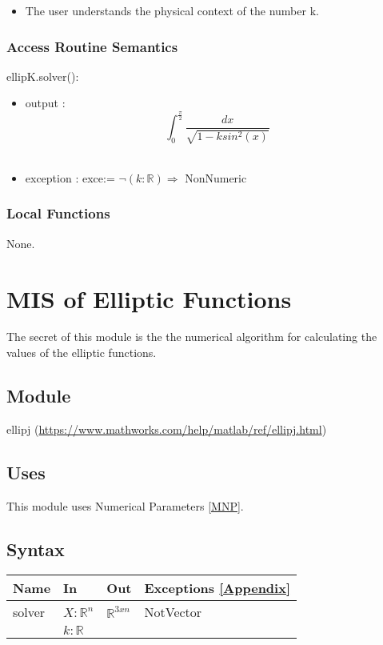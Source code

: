 \documentclass[12pt, titlepage]{article}
\begin{document}
\begin{itemize}
	\item The user understands the physical context of the number k.  
\end{itemize}

\subsubsection{Access Routine Semantics}

\noindent ellipK.solver():
\begin{itemize}
	\item output : \\
	$$ 
	\int_{0}^{\frac{\pi}{2}} \frac{dx}{\sqrt{1-ksin^{2}(x)}}$$ \\
	\item exception : exce:= $\neg(k : \mathbb{R}) \Rightarrow$ 
	NonNumeric
\end{itemize}

\subsubsection{Local Functions} 

None. 

\newpage

\section{MIS of Elliptic Functions} \label{MELF}

The secret of this module is the the numerical algorithm for calculating the 
values of the elliptic functions.

\subsection{Module}

ellipj (\url{https://www.mathworks.com/help/matlab/ref/ellipj.html})

\subsection{Uses}

This module uses Numerical Parameters \ref{MNP}. 

\subsection{Syntax}

\begin{center}
	\begin{tabular}{p{2cm} p{4cm} p{4cm} p{3cm}}
		\hline
		\textbf{Name} & \textbf{In} & \textbf{Out} & \textbf{Exceptions} 
		\ref{Appendix}\\
		\hline
		solver & $X : \mathbb{R}^{n}$ & $\mathbb{R}^{3xn}$ & 
		NotVector \\ 
		 & $k : \mathbb{R}$ &  &  \\ 
		\hline
	\end{tabular}
\end{center}
\end{document}

